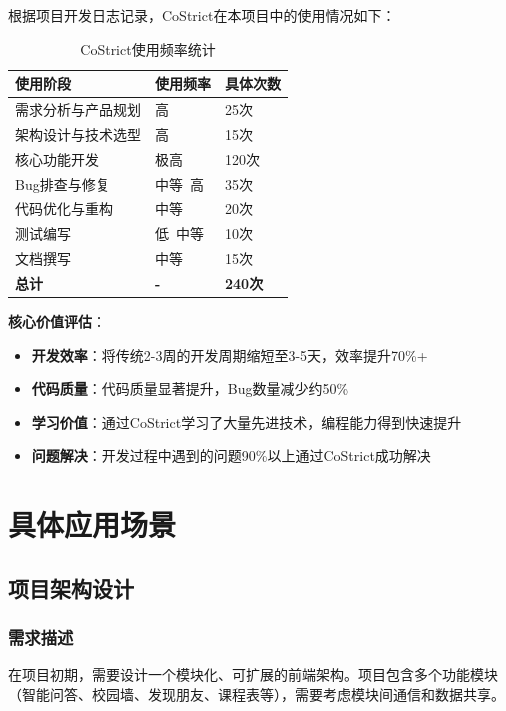 \documentclass[12pt,a4paper]{article}
\begin{document}
根据项目开发日志记录，CoStrict在本项目中的使用情况如下：

\begin{table}[ht]
\centering
\begin{tabular}{|l|l|l|}
\hline
\textbf{使用阶段} & \textbf{使用频率} & \textbf{具体次数} \\
\hline
需求分析与产品规划 & 高 & 25次 \\
\hline
架构设计与技术选型 & 高 & 15次 \\
\hline
核心功能开发 & 极高 & 120次 \\
\hline
Bug排查与修复 & 中等~高 & 35次 \\
\hline
代码优化与重构 & 中等 & 20次 \\
\hline
测试编写 & 低~中等 & 10次 \\
\hline
文档撰写 & 中等 & 15次 \\
\hline
\textbf{总计} & \textbf{-} & \textbf{240次} \\
\hline
\end{tabular}
\caption{CoStrict使用频率统计}
\end{table}

\textbf{核心价值评估}：
\begin{itemize}
    \item \textbf{开发效率}：将传统2-3周的开发周期缩短至3-5天，效率提升70\%+
    \item \textbf{代码质量}：代码质量显著提升，Bug数量减少约50\%
    \item \textbf{学习价值}：通过CoStrict学习了大量先进技术，编程能力得到快速提升
    \item \textbf{问题解决}：开发过程中遇到的问题90\%以上通过CoStrict成功解决
\end{itemize}

\section{具体应用场景}

\subsection{项目架构设计}

\subsubsection{需求描述}

在项目初期，需要设计一个模块化、可扩展的前端架构。项目包含多个功能模块（智能问答、校园墙、发现朋友、课程表等），需要考虑模块间通信和数据共享。
\end{document}
